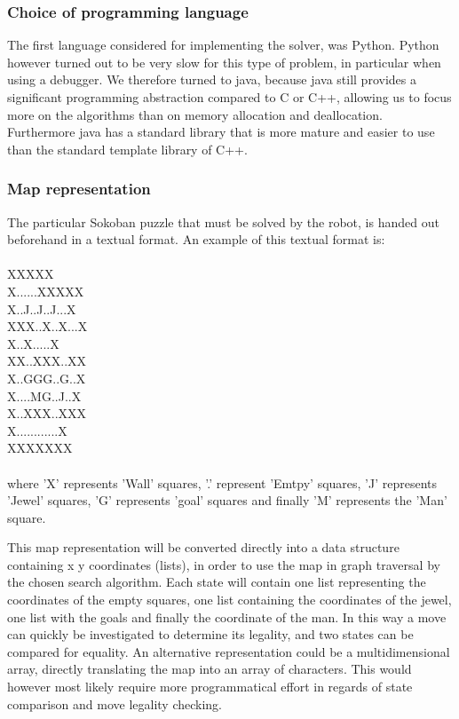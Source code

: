 \subsubsection{Choice of programming language}
The first language considered for implementing the solver, was Python. Python however turned out to be very slow for this type of problem, in particular when using a debugger. We therefore turned to java, because java still provides a significant programming abstraction compared to C or C++, allowing us to focus more on the algorithms than on memory allocation and deallocation. Furthermore java has a standard library that is more mature and easier to use than the standard template library of C++. 

\subsubsection{Map representation}
The particular Sokoban puzzle that must be solved by the robot, is handed out beforehand in a textual format. An example of this textual format is:
\\\\
XXXXX\\  
X......XXXXX\\ 
X..J..J..J...X\\  
XXX..X..X...X\\   
\hspace*{6 mm}X..X.....X\\  
\hspace*{3 mm}XX..XXX..XX\\        
\hspace*{3 mm}X..GGG..G..X\\ 
\hspace*{3 mm}X....MG..J..X\\  
\hspace*{3 mm}X..XXX..XXX\\     
\hspace*{3 mm}X............X\\
\hspace*{3 mm}XXXXXXX  
\\\\ 
where 'X' represents 'Wall' squares, '.' represent 'Emtpy' squares, 'J' represents 'Jewel' squares, 'G' represents 'goal' squares and finally 'M' represents the 'Man' square. 

This map representation will be converted directly into a data structure containing x y coordinates (lists), in order to use the map in graph traversal by the chosen search algorithm. Each state will contain one list representing the coordinates of the empty squares, one list containing the coordinates of the jewel, one list with the goals and finally the coordinate of the man. In this way a move can quickly be investigated to determine its legality, and two states can be compared for equality.
An alternative representation could be a multidimensional array, directly translating the map into an array of characters. This would however most likely require more programmatical effort in regards of state comparison and move legality checking.

